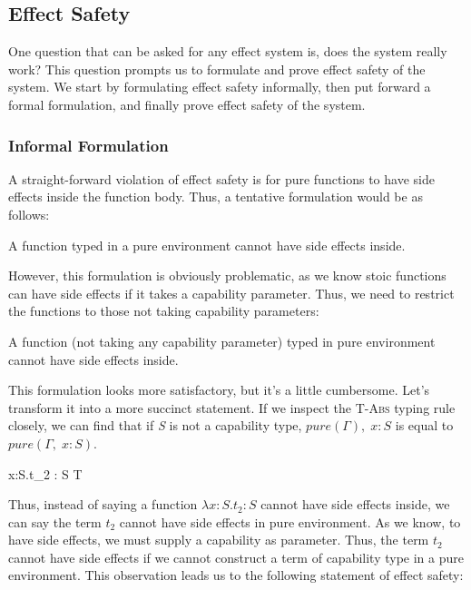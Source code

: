 \subsection{Effect Safety}

One question that can be asked for any effect system is, does the
system really work? This question prompts us to formulate and prove
effect safety of the system. We start by formulating effect safety
informally, then put forward a formal formulation, and finally prove
effect safety of the system.

\subsubsection{Informal Formulation}

A straight-forward violation of effect safety is for pure functions to
have side effects inside the function body. Thus, a tentative
formulation would be as follows:

\begin{definition}
A function typed in a pure environment cannot have side effects inside.
\end{definition}

However, this formulation is obviously problematic, as we know stoic
functions can have side effects if it takes a capability
parameter. Thus, we need to restrict the functions to those not taking
capability parameters:

\begin{definition}
  A function (not taking any capability parameter) typed in pure
  environment cannot have side effects inside.
\end{definition}

This formulation looks more satisfactory, but it's a little
cumbersome. Let's transform it into a more succinct statement. If we
inspect the \textsc{T-Abs} typing rule closely, we can find that if
\emph{S} is not a capability type, $pure(\Gamma),\; x: S$ is equal to
$pure(\Gamma,\; x: S)$.

{ \Gamma \vdash \lambda x:S.\;t_2 : S \to T }

Thus, instead of saying a function $\lambda x:S.t_2 : S$ cannot have
side effects inside, we can say the term $t_2$ cannot have side
effects in pure environment. As we know, to have side effects, we must
supply a capability as parameter. Thus, the term $t_2$ cannot have
side effects if we cannot construct a term of capability type in a
pure environment. This observation leads us to the following statement
of effect safety:

